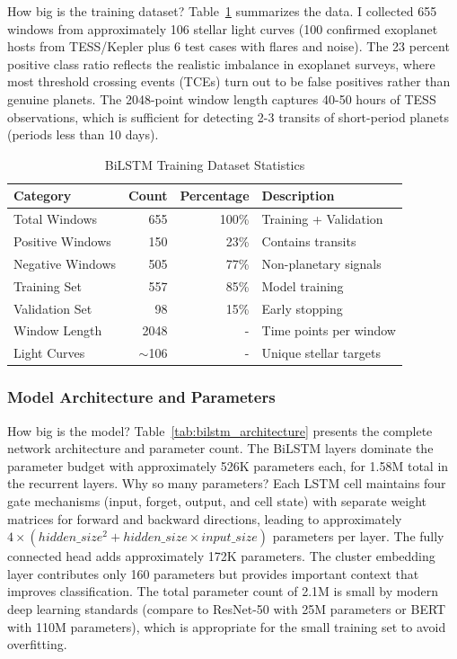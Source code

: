 \documentclass[letterpaper]{article} %
\begin{document}
How big is the training dataset? Table~\ref{tab:bilstm_dataset} summarizes the data. I collected 655 windows from approximately 106 stellar light curves (100 confirmed exoplanet hosts from TESS/Kepler plus 6 test cases with flares and noise). The 23 percent positive class ratio reflects the realistic imbalance in exoplanet surveys, where most threshold crossing events (TCEs) turn out to be false positives rather than genuine planets. The 2048-point window length captures 40-50 hours of TESS observations, which is sufficient for detecting 2-3 transits of short-period planets (periods less than 10 days).

\begin{table}[h]
\centering
\caption{BiLSTM Training Dataset Statistics}
\label{tab:bilstm_dataset}
\begin{tabular}{@{}lrrl@{}}
\toprule
\textbf{Category} & \textbf{Count} & \textbf{Percentage} & \textbf{Description} \\
\midrule
Total Windows & 655 & 100\% & Training + Validation \\
Positive Windows & 150 & 23\% & Contains transits \\
Negative Windows & 505 & 77\% & Non-planetary signals \\
Training Set & 557 & 85\% & Model training \\
Validation Set & 98 & 15\% & Early stopping \\
Window Length & 2048 & - & Time points per window \\
Light Curves & $\sim$106 & - & Unique stellar targets \\
\bottomrule
\end{tabular}
\end{table}

\subsubsection{Model Architecture and Parameters}

How big is the model? Table~\ref{tab:bilstm_architecture} presents the complete network architecture and parameter count. The BiLSTM layers dominate the parameter budget with approximately 526K parameters each, for 1.58M total in the recurrent layers. Why so many parameters? Each LSTM cell maintains four gate mechanisms (input, forget, output, and cell state) with separate weight matrices for forward and backward directions, leading to approximately $4 \times (hidden\_size^2 + hidden\_size \times input\_size)$ parameters per layer. The fully connected head adds approximately 172K parameters. The cluster embedding layer contributes only 160 parameters but provides important context that improves classification. The total parameter count of 2.1M is small by modern deep learning standards (compare to ResNet-50 with 25M parameters or BERT with 110M parameters), which is appropriate for the small training set to avoid overfitting.
\end{document}
